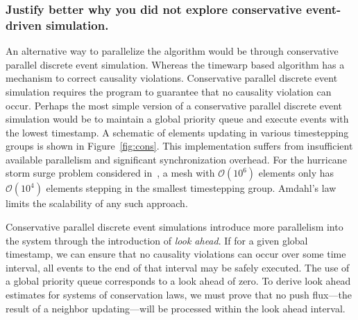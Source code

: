 \documentclass[10pt,letterpaper]{article}
\begin{document}
\subsubsection*{Justify better why you did not explore conservative event-driven simulation.}


An alternative way to parallelize the algorithm would be through conservative parallel discrete event simulation. Whereas the timewarp based algorithm has a mechanism to correct causality violations. Conservative parallel discrete event simulation requires the program to guarantee that no causality violation can occur. Perhaps the most simple version of a conservative parallel discrete event simulation would be to maintain a global priority queue and execute events with the lowest timestamp. A schematic of elements updating in various timestepping groups is shown in Figure~\ref{fig:cons}. This implementation suffers from insufficient available parallelism and significant synchronization overhead. For the hurricane storm surge problem considered in~\cite{DawsonLTS}, a mesh with $\mathcal{O}(10^6)$ elements only has $\mathcal{O}(10^4)$ elements stepping in the smallest timestepping group. Amdahl's law limits the scalability of any such approach.

Conservative parallel discrete event simulations introduce more parallelism into the system through the introduction of {\em look ahead}. If for a given global timestamp, we can ensure that no causality violations can occur over some time interval, all events to the end of that interval may be safely executed. The use of a global priority queue corresponds to a look ahead of zero. To derive look ahead estimates for systems of conservation laws, we must prove that no push flux---the result of a neighbor updating---will be processed within the look ahead interval. 
\end{document}
